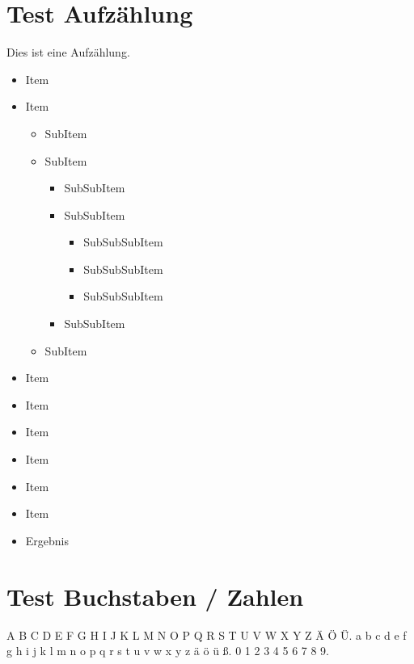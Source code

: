 \documentclass[a0paper,noDIN,MathematikA0]{tudmathposter}
\begin{document}
\section*{Test Aufzählung}
\begin{multicols}{2}
Dies ist eine Aufzählung.

\begin{itemize}
\item Item
\item Item
  \begin{itemize}
  \item SubItem
  \item SubItem
    \begin{itemize}
    \item SubSubItem
    \item SubSubItem
      \begin{itemize}
      \item SubSubSubItem
      \item SubSubSubItem
      \item SubSubSubItem
      \end{itemize}
    \item SubSubItem
    \end{itemize}
  \item SubItem
  \end{itemize}
\renewcommand*\labelitemi{\textbullet}
\item Item \vrule\kern1cm\vrule
\renewcommand*\labelitemi{\textbullet\,}
\item Item \vrule\kern1cm\vrule
\renewcommand*\labelitemi{\textbullet\kern 0.25em}
\item Item \vrule\kern1cm\vrule
\renewcommand*\labelitemi{\textbullet\,\,}
\item Item \vrule\kern1cm\vrule
\renewcommand*\labelitemi{\textbullet\enspace}
\item Item \vrule\kern1cm\vrule
\renewcommand*\labelitemi{\textbullet\kern 1em}
\item Item \vrule\kern1cm\vrule
\item[\raisebox{.2ex}{$\Rightarrow$}] Ergebnis
\end{itemize}

\section*{Test Buchstaben / Zahlen}
A B C D E F G H I J K L M N O P Q R S T U V W X Y Z Ä Ö Ü.
a b c d e f g h i j k l m n o p q r s t u v w x y z ä ö ü ß.
0 1 2 3 4 5 6 7 8 9.


\end{multicols}
\end{document}
